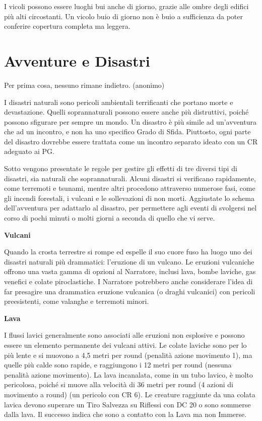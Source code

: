 \documentclass[a4paper,11pt,twoside,openany]{book}
\begin{document}
I vicoli possono essere luoghi bui anche di giorno, grazie alle ombre degli edifici più alti circostanti. Un vicolo buio di giorno non è buio a sufficienza da poter conferire copertura completa ma leggera.

\pagebreak

\section{Avventure e Disastri}

\label{avventure-e-disastri}
\begin{tcolorbox}[enhanced,arc=5pt,boxrule=0.3pt]{Per prima cosa, nessuno rimane indietro. (anonimo)}\end{tcolorbox}\medskip
I disastri naturali sono pericoli ambientali terrificanti che portano morte e devastazione. Quelli soprannaturali posso­no essere anche più distruttivi, poiché possono sfigurare per sempre un mondo. Un disastro è più simile ad un'avventura che ad un incontro, e non ha uno specifico Grado di Sfida. Piuttosto, ogni parte del disastro dovrebbe essere trattata come un incontro separato ideato con un CR adeguato ai PG.

Sotto vengono presentate le regole per gestire gli effetti di tre diversi tipi di disastri, sia naturali che soprannaturali. Alcuni disastri si verificano rapidamente, come terremoti e tsunami, mentre altri procedono attraverso numerose fasi, come gli incendi forestali, i vulcani e le sollevazioni di non morti. Aggiustate lo schema dell'avventura per adattarlo al disastro, per permettere agli eventi di svolgersi nel corso di pochi minuti o molti giorni a seconda di quello che vi serve.

\textbf{Vulcani}

Quando la crosta terrestre si rompe ed espelle il suo cuore fuso ha luogo uno dei disastri naturali più drammatici: l'eruzione di un vulcano. Le eruzioni vulcaniche offrono una vasta gamma di opzioni al Narratore, inclusi lava, bombe laviche, gas venefici e colate piroclastiche. I Narratore potrebbero anche considerare l'idea di far presagire una drammatica eruzione vulcanica (o draghi vulcanici) con pericoli preesistenti, come valanghe e terremoti minori.

\textbf{Lava}

I flussi lavici generalmente sono associati alle eruzioni non esplosive e possono essere un elemento permanente dei vulcani attivi. Le colate laviche sono per lo più lente e si muovono a 4,5 metri per round (penalità azione movimento 1), ma quelle più calde sono rapide, e raggiungono i 12 metri per round (nessuna penalità azione movimento). La lava incanalata, come in un tubo lavico, è molto pericolosa, poiché si muove alla velocità di 36 metri per round (4 azioni di movimento a round) (un pericolo con CR 6). Le creature raggiunte da una colata lavica devono superare un Tiro Salvezza su Riflessi con DC 20 o sono sommerse dalla lava. Il successo indica che sono a contatto con la Lava ma non Immerse.
\end{document}
